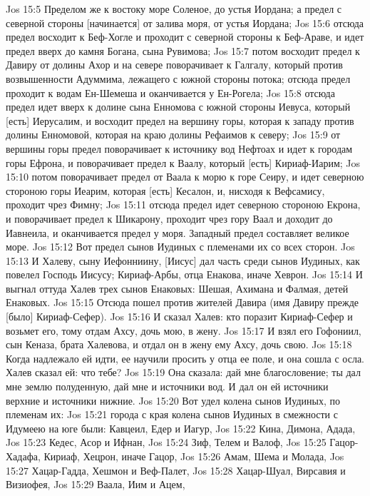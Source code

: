 Jos 15:5  Пределом же к востоку море Соленое, до устья Иордана; а предел с северной стороны [начинается] от залива моря, от устья Иордана;
Jos 15:6  отсюда предел восходит к Беф-Хогле и проходит с северной стороны к Беф-Араве, и идет предел вверх до камня Богана, сына Рувимова;
Jos 15:7  потом восходит предел к Давиру от долины Ахор и на севере поворачивает к Галгалу, который против возвышенности Адуммима, лежащего с южной стороны потока; отсюда предел проходит к водам Ен-Шемеша и оканчивается у Ен-Рогела;
Jos 15:8  отсюда предел идет вверх к долине сына Енномова с южной стороны Иевуса, который [есть] Иерусалим, и восходит предел на вершину горы, которая к западу против долины Енномовой, которая на краю долины Рефаимов к северу;
Jos 15:9  от вершины горы предел поворачивает к источнику вод Нефтоах и идет к городам горы Ефрона, и поворачивает предел к Ваалу, который [есть] Кириаф-Иарим;
Jos 15:10  потом поворачивает предел от Ваала к морю к горе Сеиру, и идет северною стороною горы Иеарим, которая [есть] Кесалон, и, нисходя к Вефсамису, проходит чрез Фимну;
Jos 15:11  отсюда предел идет северною стороною Екрона, и поворачивает предел к Шикарону, проходит чрез гору Ваал и доходит до Иавнеила, и оканчивается предел у моря. Западный предел составляет великое море.
Jos 15:12  Вот предел сынов Иудиных с племенами их со всех сторон.
Jos 15:13  И Халеву, сыну Иефонниину, [Иисус] дал часть среди сынов Иудиных, как повелел Господь Иисусу; Кириаф-Арбы, отца Енакова, иначе Хеврон.
Jos 15:14  И выгнал оттуда Халев трех сынов Енаковых: Шешая, Ахимана и Фалмая, детей Енаковых.
Jos 15:15  Отсюда пошел против жителей Давира (имя Давиру прежде [было] Кириаф-Сефер).
Jos 15:16  И сказал Халев: кто поразит Кириаф-Сефер и возьмет его, тому отдам Ахсу, дочь мою, в жену.
Jos 15:17  И взял его Гофониил, сын Кеназа, брата Халевова, и отдал он в жену ему Ахсу, дочь свою.
Jos 15:18  Когда надлежало ей идти, ее научили просить у отца ее поле, и она сошла с осла. Халев сказал ей: что тебе?
Jos 15:19  Она сказала: дай мне благословение; ты дал мне землю полуденную, дай мне и источники вод. И дал он ей источники верхние и источники нижние.
Jos 15:20  Вот удел колена сынов Иудиных, по племенам их:
Jos 15:21  города с края колена сынов Иудиных в смежности с Идумеею на юге были: Кавцеил, Едер и Иагур,
Jos 15:22  Кина, Димона, Адада,
Jos 15:23  Кедес, Асор и Ифнан,
Jos 15:24  Зиф, Телем и Валоф,
Jos 15:25  Гацор-Хадафа, Кириаф, Хецрон, иначе Гацор,
Jos 15:26  Амам, Шема и Молада,
Jos 15:27  Хацар-Гадда, Хешмон и Веф-Палет,
Jos 15:28  Хацар-Шуал, Вирсавия и Визиофея,
Jos 15:29  Ваала, Иим и Ацем,
